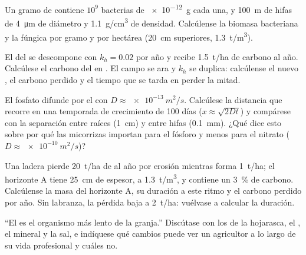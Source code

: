 \begin{exercise}[$\star\star$]\label{exo:b2:living-soil:8}
Un gramo de  contiene $10^{9}$ bacterias de \qty{e-12}{g} cada una, y
\qty{100}{m} de hifas de \qty{4}{\micro m} de diámetro y
\qty{1.1}{g/cm^3} de densidad. Calcúlense la biomasa bacteriana y la
fúngica por gramo y por hectárea (\qty{20}{cm} superiores,
\qty{1.3}{t/m^3}).
\end{exercise}

\begin{exercise}[$\star\star$]\label{exo:b2:living-soil:9}
El  del  se descompone con $k_h = 0.02$ por año y recibe
\qty{1.5}{t/ha} de carbono al año. Calcúlese el carbono del  en
. El campo se ara y $k_h$ se duplica: calcúlense el nuevo
, el carbono perdido y el tiempo que se tarda en perder
la mitad.
\end{exercise}

\begin{exercise}[$\star\star\star$]\label{exo:b2:living-soil:10}
El fosfato difunde por el  con $D \approx \qty{e-13}{m^2/s}$.
Calcúlese la distancia que recorre en una temporada de crecimiento de
\num{100} días ($x \approx \sqrt{2Dt}$) y compárese con la separación
entre raíces (\qty{1}{cm}) y entre hifas (\qty{0.1}{mm}). ¿Qué dice esto
sobre por qué las micorrizas importan para el fósforo y menos para el
nitrato
($D \approx \qty{e-10}{m^2/s}$)?
\end{exercise}

\begin{exercise}[$\star\star\star$]\label{exo:b2:living-soil:11}
Una ladera pierde \qty{20}{t/ha} de  al año por erosión mientras
forma \qty{1}{t/ha}; el horizonte A tiene \qty{25}{cm} de espesor, a
\qty{1.3}{t/m^3}, y contiene un \qty{3}{\%} de carbono. Calcúlense la masa
del horizonte A, su duración a este ritmo y el carbono perdido por año.
Sin labranza, la pérdida baja a \qty{2}{t/ha}: vuélvase a calcular la
duración.
\end{exercise}

\begin{exercise}[$\star\star\star$]\label{exo:b2:living-soil:12}
``El  es el organismo más lento de la granja.'' Discútase con los
 de la hojarasca, el , el  mineral y la sal,
e indíquese qué cambios puede ver un agricultor a lo largo de su vida
profesional y cuáles no.
\end{exercise}


